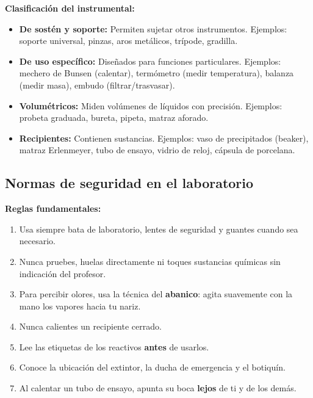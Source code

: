 \documentclass[12pt, letterpaper]{article}
\begin{document}
\begin{cuadrosolucion}
  \textbf{Clasificación del instrumental:}
  \begin{itemize}[leftmargin=*]
    \item \textbf{De sostén y soporte:} Permiten sujetar otros instrumentos. Ejemplos: soporte universal, pinzas, aros metálicos, trípode, gradilla.
    \item \textbf{De uso específico:} Diseñados para funciones particulares. Ejemplos: mechero de Bunsen (calentar), termómetro (medir temperatura), balanza (medir masa), embudo (filtrar/trasvasar).
    \item \textbf{Volumétricos:} Miden volúmenes de líquidos con precisión. Ejemplos: probeta graduada, bureta, pipeta, matraz aforado.
    \item \textbf{Recipientes:} Contienen sustancias. Ejemplos: vaso de precipitados (beaker), matraz Erlenmeyer, tubo de ensayo, vidrio de reloj, cápsula de porcelana.
  \end{itemize}
\end{cuadrosolucion}



\subsection{Normas de seguridad en el laboratorio}

\begin{cuadroextra}
  \textbf{Reglas fundamentales:}
  \begin{enumerate}[leftmargin=*, label=\arabic*.]
    \item Usa siempre bata de laboratorio, lentes de seguridad y guantes cuando sea necesario.
    \item Nunca pruebes, huelas directamente ni toques sustancias químicas sin indicación del profesor.
    \item Para percibir olores, usa la técnica del \textbf{abanico}: agita suavemente con la mano los vapores hacia tu nariz.
    \item Nunca calientes un recipiente cerrado.
    \item Lee las etiquetas de los reactivos \textbf{antes} de usarlos.
    \item Conoce la ubicación del extintor, la ducha de emergencia y el botiquín.
    \item Al calentar un tubo de ensayo, apunta su boca \textbf{lejos} de ti y de los demás.
  \end{enumerate}
\end{cuadroextra}
\end{document}
